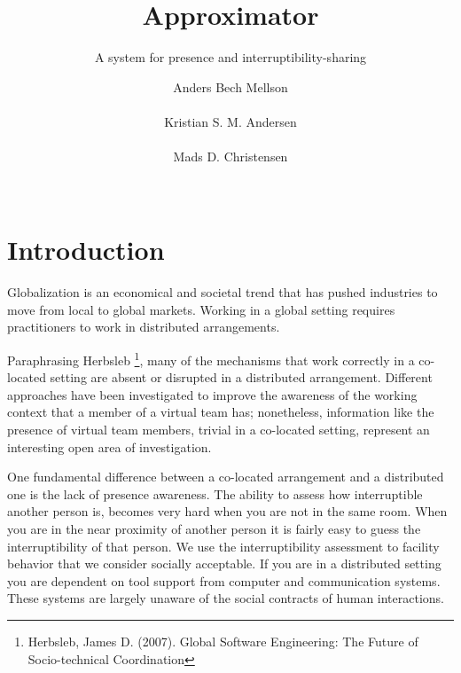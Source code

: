 \documentclass{sigchi}
\begin{document}
\title{Approximator}
\subtitle{A system for presence and interruptibility-sharing}
\author{
  \alignauthor Anders Bech Mellson\\
    \\
  \alignauthor Kristian S. M. Andersen\\
    \\
  \alignauthor Mads D. Christensen\\
    \\
}

\maketitle

\begin{abstract}

\end{abstract}



\section{Introduction}
Globalization is an economical and societal trend that has pushed industries to move from local to global markets.
Working in a global setting requires practitioners to work in distributed arrangements.

Paraphrasing Herbsleb \footnote{Herbsleb, James D. (2007). Global Software Engineering: The Future of Socio-technical Coordination}, many of the mechanisms that work correctly in a co-located setting are absent or disrupted in a distributed arrangement.
Different approaches have been investigated to improve the awareness of the working context that a member of a virtual team has; nonetheless, information like the presence of virtual team members, trivial in a co-located setting, represent an interesting open area of investigation.

One fundamental difference between a co-located arrangement and a distributed one is the lack of presence awareness.
The ability to assess how interruptible another person is, becomes very hard when you are not in the same room.
When you are in the near proximity of another person it is fairly easy to guess the interruptibility of that person.
We use the interruptibility assessment to facility behavior that we consider socially acceptable.
If you are in a distributed setting you are dependent on tool support from computer and communication systems.
These systems are largely unaware of the social contracts of human interactions.
\end{document}
